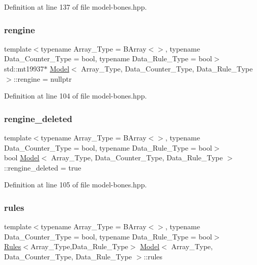 Definition at line 137 of file model-\/bones.\+hpp.

\mbox{\label{class_model_a0f890665302d545663698000cd13a73f}} 
\subsubsection{\texorpdfstring{rengine}{rengine}}
{\footnotesize\ttfamily template$<$typename Array\+\_\+\+Type = B\+Array$<$$>$, typename Data\+\_\+\+Counter\+\_\+\+Type = bool, typename Data\+\_\+\+Rule\+\_\+\+Type = bool$>$ \\
std\+::mt19937$\ast$ \hyperlink{class_model}{Model}$<$ Array\+\_\+\+Type, Data\+\_\+\+Counter\+\_\+\+Type, Data\+\_\+\+Rule\+\_\+\+Type $>$\+::rengine = nullptr}



Definition at line 104 of file model-\/bones.\+hpp.

\mbox{\label{class_model_ab541ac2a0bbac640e2b8cdd745f1a632}} 
\subsubsection{\texorpdfstring{rengine\+\_\+deleted}{rengine\_deleted}}
{\footnotesize\ttfamily template$<$typename Array\+\_\+\+Type = B\+Array$<$$>$, typename Data\+\_\+\+Counter\+\_\+\+Type = bool, typename Data\+\_\+\+Rule\+\_\+\+Type = bool$>$ \\
bool \hyperlink{class_model}{Model}$<$ Array\+\_\+\+Type, Data\+\_\+\+Counter\+\_\+\+Type, Data\+\_\+\+Rule\+\_\+\+Type $>$\+::rengine\+\_\+deleted = true}



Definition at line 105 of file model-\/bones.\+hpp.

\mbox{\label{class_model_a65b96a73f8dba8a00cc767753aaca22b}} 
\subsubsection{\texorpdfstring{rules}{rules}}
{\footnotesize\ttfamily template$<$typename Array\+\_\+\+Type = B\+Array$<$$>$, typename Data\+\_\+\+Counter\+\_\+\+Type = bool, typename Data\+\_\+\+Rule\+\_\+\+Type = bool$>$ \\
\hyperlink{class_rules}{Rules}$<$Array\+\_\+\+Type,Data\+\_\+\+Rule\+\_\+\+Type$>$ \hyperlink{class_model}{Model}$<$ Array\+\_\+\+Type, Data\+\_\+\+Counter\+\_\+\+Type, Data\+\_\+\+Rule\+\_\+\+Type $>$\+::rules}



